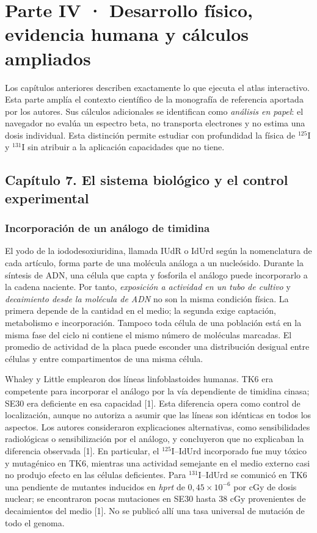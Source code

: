 \documentclass[11pt,a4paper,oneside]{article}
\begin{document}
\clearpage
\section{Parte IV · Desarrollo físico, evidencia humana y cálculos ampliados}
\label{parte-ampliada}

Los capítulos anteriores describen exactamente lo que ejecuta el atlas interactivo.
Esta parte amplía el contexto científico de la monografía de referencia aportada por
los autores. Sus cálculos adicionales se identifican como \emph{análisis en papel}:
el navegador no evalúa un espectro beta, no transporta electrones y no estima una
dosis individual. Esta distinción permite estudiar con profundidad la física de
$^{125}$I y $^{131}$I sin atribuir a la aplicación capacidades que no tiene.

\subsection{Capítulo 7. El sistema biológico y el control experimental}
\label{ampliacion-sistema}

\subsubsection{Incorporación de un análogo de timidina}
El yodo de la iododesoxiuridina, llamada IUdR o IdUrd según la nomenclatura de
cada artículo, forma parte de una molécula análoga a un nucleósido. Durante la
síntesis de ADN, una célula que capta y fosforila el análogo puede incorporarlo
a la cadena naciente. Por tanto, \emph{exposición a actividad en un tubo de cultivo}
y \emph{decaimiento desde la molécula de ADN} no son la misma condición física.
La primera depende de la cantidad en el medio; la segunda exige captación,
metabolismo e incorporación. Tampoco toda célula de una población está en la
misma fase del ciclo ni contiene el mismo número de moléculas marcadas. El
promedio de actividad de la placa puede esconder una distribución desigual entre
células y entre compartimentos de una misma célula.

Whaley y Little emplearon dos líneas linfoblastoides humanas. TK6 era competente
para incorporar el análogo por la vía dependiente de timidina cinasa; SE30 era
deficiente en esa capacidad [1]. Esta diferencia opera como control de
localización, aunque no autoriza a asumir que las líneas son idénticas en todos
los aspectos. Los autores consideraron explicaciones alternativas, como
sensibilidades radiológicas o sensibilización por el análogo, y concluyeron que
no explicaban la diferencia observada [1]. En particular, el $^{125}$I--IdUrd
incorporado fue muy tóxico y mutagénico en TK6, mientras una actividad semejante
en el medio externo casi no produjo efecto en las células deficientes. Para
$^{131}$I--IdUrd se comunicó en TK6 una pendiente de mutantes inducidos en
\emph{hprt} de $0,45\times10^{-6}$ por cGy de dosis nuclear; se encontraron
pocas mutaciones en SE30 hasta 38 cGy provenientes de decaimientos del medio
[1]. No se publicó allí una tasa universal de mutación de todo el genoma.
\end{document}
